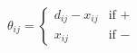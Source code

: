 \documentclass[preview]{standalone}
\begin{document}
\begin{center}
$\theta_{ij} = \left\{\begin{array}{ll} d_{ij} - x_{ij} & \text{if } + \\ x_{ij} & \text{if } - \end{array} \right.$
\end{center}
\end{document}
